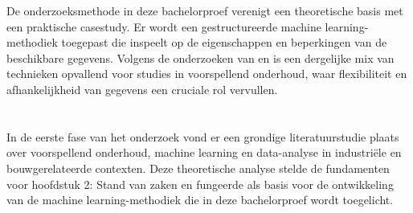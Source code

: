 De onderzoeksmethode in deze bachelorproef verenigt een theoretische basis met een praktische casestudy. Er wordt een gestructureerde machine learning-method\-iek toegepast die inspeelt op de eigenschappen en beperkingen van de beschikbare gegevens. Volgens de onderzoeken van \textcite{Mahale2025} en \textcite{Xue2025} is een dergelijke mix van technieken opvallend voor studies in voorspellend onderhoud, waar flexibiliteit en afhankelijkheid van gegevens een cruciale rol vervullen.




\newpage

\section{}%
\label{sec: Onderzoek naar literatuur en theoretische basis}

In de eerste fase van het onderzoek vond er een grondige literatuurstudie plaats over voorspellend onderhoud, machine learning en data-analyse in industriële en bouwgerelateerde contexten. Deze theoretische analyse stelde de fundamenten voor hoofdstuk 2: Stand van zaken en fungeerde als basis voor de ontwikkeling van de machine learning-methodiek die in deze bachelorproef wordt toegelicht.

